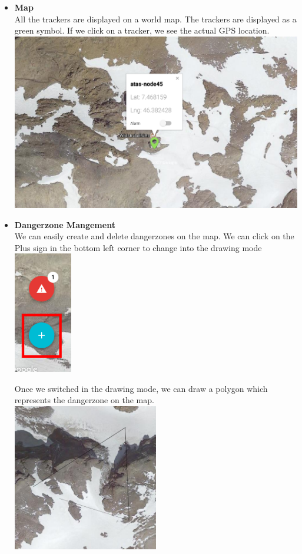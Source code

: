 \documentclass[a4paper,11pt, oneside]{report}
\theoremstyle{definition}
\begin{document}
\begin{itemize}
\item \textbf{Map}\\ 
All the trackers are displayed on a world map. The trackers are displayed as a green symbol. If we click on a tracker, we see the actual GPS location.\\[0.3cm]
\includegraphics[width=\textwidth]{img/atas-web-map.png}

\item \textbf{Dangerzone Mangement} \\
We can easily create and delete dangerzones on the map. We can click on the Plus sign in the bottom left corner to change into the drawing mode\\[0.3cm]
\includegraphics[width=0.2\textwidth]{img/atas-web-adddangerzone.png}

\newpage
Once we switched in the drawing mode, we can draw a polygon which represents the dangerzone on the map.\\[0.3cm]

\includegraphics[width=0.5\textwidth]{img/atas-web-drawing.png}\\


\end{itemize}
\end{document}
